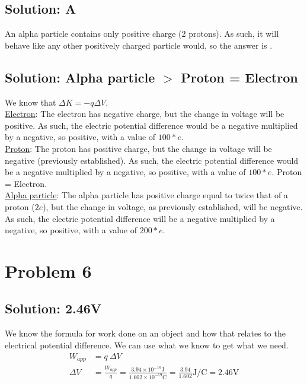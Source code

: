 \documentclass[12pt]{article}
\begin{document}
\subsection{Solution: A}
An alpha particle contains only positive charge (2 protons). 
As such, it will behave like any other positively charged particle would, so the answer is .

\subsection{Solution: Alpha particle $>$ Proton = Electron}
We know that $\Delta K = -q \Delta V$.\\
\underline{Electron}: The electron has negative charge, but the change in voltage will be positive.
As such, the electric potential difference would be a negative multiplied by a negative, so positive, with a value of $100*e$.\\
\underline{Proton}: The proton has positive charge, but the change in voltage will be negative (previously established).
As such, the electric potential difference would be a negative multiplied by a negative, so positive, with a value of $100*e$.
Proton = Electron.\\
\underline{Alpha particle}: The alpha particle has positive charge equal to twice that of a proton ($2e$), but the change in voltage, as previously established, will be negative.
As such, the electric potential difference will be a negative multiplied by a negative, so positive, with a value of $200*e$.

\section{Problem 6}

\subsection{Solution: 2.46V}
We know the formula for work done on an object and how that relates to the electrical potential difference.
We can use what we know to get what we need.
\begin{align*}
    W_{app} &=  q\ \Delta V\\
    \Delta V    &=  \frac{W_{app}}{q}
        =   \frac{3.94 \times 10^{-19} \unit{\joule}}{1.602 \times 10^{-19} \unit{\coulomb}}
        =   \frac{3.94}{1.602} \unit{\joule/\coulomb}
        =   \boxed{2.46 \unit{\volt}}
\end{align*}
\end{document}
